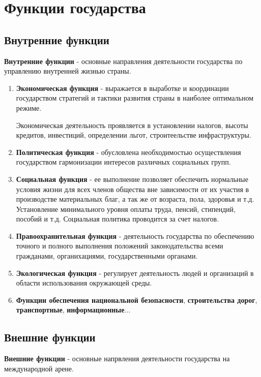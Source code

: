 \documentclass[a5paper,10pt]{article}
\begin{document}
	\section{Функции государства}
		\subsection{Внутренние функции}
			\textbf{Внутренние функции} - основные направления деятельности государства по управлению внутренней жизнью страны.

			\begin{enumerate}
				\item \textbf{Экономическая функция} - выражается в выработке и координации государством стратегий и тактики развития страны в наиболее оптимальном режиме.
				\begin{framed}
					Экономическая деятельность проявляется в установлении налогов, высоты кредитов, инвестиций, определении льгот, строитеельстве инфраструктуры.
				\end{framed}

				\item \textbf{Политическая функция} - обусловлена необходимостью осуществления государством гармонизации интересов различных социальных групп.

				\item \textbf{Социальная функция} - ее выполнение позволяет обеспечить нормальные условия жизни для всех членов общества вне зависимости от их участия в производстве материальных благ, а так же от возраста, пола, здоровья и т.д. Установление минимального уровня оплаты труда, пенсий, стипендий, пособий и т.д. Социальная политика проводится за счет налогов.

				\item \textbf{Правоохранительная функция} - деятельность государства по обеспечению точного и полного выполнения положений законодательства всеми гражданами, органихациями, государственными органами.

				\item \textbf{Экологическая функция} - регулирует деятельность людей и организаций в области использования окружающей среды.

				\item \textbf{Функции обеспечения национальной безопасности}, \textbf{строительства дорог}, \textbf{транспортные}, \textbf{информационные}...
			\end{enumerate}

		\subsection{Внешние функции}
			\textbf{Внешние функции} - основные напрвления деятельности государства на международной арене.
\end{document}
